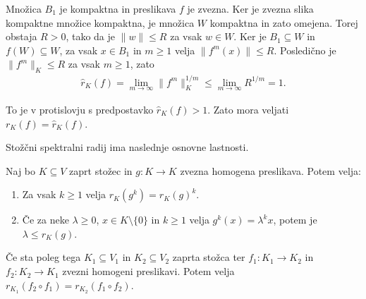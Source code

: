 \documentclass[mat2, tisk]{fmfdelo}
\begin{document}
\begin{dokaz}
  Množica $B_1$ je kompaktna in preslikava $f$ je zvezna. Ker je zvezna slika kompaktne množice kompaktna, 
  je množica $W$ kompaktna in zato omejena. Torej obstaja $R>0$, tako da je
  $\|w\|\leq R$ za vsak $w\in W$. Ker je $B_1\subseteq W$ in
  $f(W)\subseteq W$, za vsak $x\in B_1$ in $m\geq1$ velja
  $\|f^m(x)\|\leq R$. Posledično je $\|f^m\|_K\leq R$ za vsak $m\geq1$,
  zato
  \begin{align*}
  \widehat r_K(f)
  =
  \lim_{m\to\infty}\|f^m\|_K^{1/m}
  \leq
  \lim_{m\to\infty}R^{1/m}
  =
  1.
  \end{align*}

  To je v protislovju s predpostavko $\widehat r_K(f)>1$. Zato mora
  veljati $r_K(f)=\widehat r_K(f)$.
\end{dokaz}

Stožčni spektralni radij ima naslednje osnovne lastnosti.

\begin{trditev}\label{trd:lastnosti_stozcnega_spektralnega_radija}
  Naj bo $K\subseteq V$ zaprt stožec in
  $g\colon K\longrightarrow K$ zvezna homogena preslikava. Potem velja:
  \begin{enumerate}[label=(\roman*)]
  \item Za vsak $k\geq1$ velja $r_K(g^k)=r_K(g)^k$.
  \item Če za neke $\lambda\geq0$, $x\in K\setminus\{0\}$
  in $k\geq1$ velja $g^k(x)=\lambda^k x$,
  potem je $\lambda\leq r_K(g)$.
  \end{enumerate}

  Če sta poleg tega $K_1\subseteq V_1$ in $K_2\subseteq V_2$ zaprta
  stožca ter 
  $f_1\colon K_1\longrightarrow K_2$ in
  $f_2\colon K_2\longrightarrow K_1$ zvezni homogeni preslikavi.
  Potem velja
  $r_{K_1}(f_2\circ f_1)=r_{K_2}(f_1\circ f_2)$.
\end{trditev}
\end{document}
